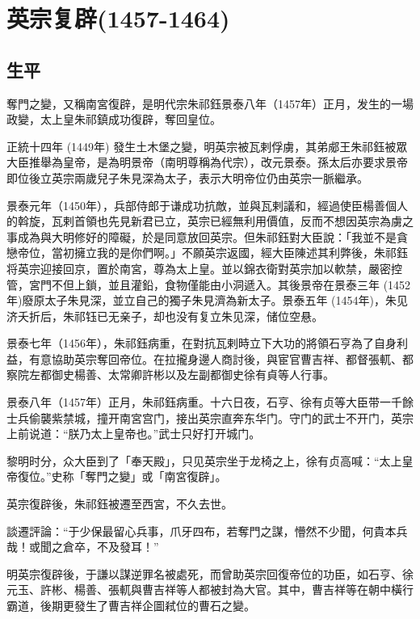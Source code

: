 
\section{英宗复辟\tiny(1457-1464)}

\subsection{生平}

奪門之變，又稱南宮復辟，是明代宗朱祁鈺景泰八年（1457年）正月，发生的一場政變，太上皇朱祁鎮成功復辟，奪回皇位。

正統十四年 (1449年) 發生土木堡之變，明英宗被瓦剌俘虜，其弟郕王朱祁鈺被眾大臣推舉為皇帝，是為明景帝（南明尊稱為代宗），改元景泰。孫太后亦要求景帝即位後立英宗兩歲兒子朱見深為太子，表示大明帝位仍由英宗一脈繼承。

景泰元年（1450年），兵部侍郎于谦成功抗敵，並與瓦剌議和，經過使臣楊善個人的斡旋，瓦剌首領也先見新君已立，英宗已經無利用價值，反而不想因英宗為虜之事成為與大明修好的障礙，於是同意放回英宗。但朱祁鈺對大臣說：「我並不是貪戀帝位，當初擁立我的是你們啊。」不願英宗返國，經大臣陳述其利弊後，朱祁鈺将英宗迎接回京，置於南宮，尊為太上皇。並以錦衣衛對英宗加以軟禁，嚴密控管，宮門不但上鎖，並且灌鉛，食物僅能由小洞遞入。其後景帝在景泰三年 (1452年)廢原太子朱見深，並立自己的獨子朱見濟為新太子。景泰五年 (1454年)，朱见济夭折后，朱祁钰已无亲子，却也没有复立朱见深，储位空悬。

景泰七年（1456年），朱祁鈺病重，在對抗瓦剌時立下大功的將領石亨為了自身利益，有意協助英宗奪回帝位。在拉攏身邊人商討後，與宦官曹吉祥、都督張軏、都察院左都御史楊善、太常卿許彬以及左副都御史徐有貞等人行事。

景泰八年（1457年）正月，朱祁鈺病重。十六日夜，石亨、徐有贞等大臣带一千餘士兵偷襲紫禁城，撞开南宮宫门，接出英宗直奔东华门。守门的武士不开门，英宗上前说道：“朕乃太上皇帝也。”武士只好打开城门。

黎明时分，众大臣到了「奉天殿」，只见英宗坐于龙椅之上，徐有贞高喊：“太上皇帝復位。”史称「奪門之變」或「南宮復辟」。

英宗復辟後，朱祁鈺被遷至西宮，不久去世。

談遷評論：“于少保最留心兵事，爪牙四布，若奪門之謀，懵然不少聞，何貴本兵哉！或聞之倉卒，不及發耳！”

明英宗復辟後，于謙以謀逆罪名被處死，而曾助英宗回復帝位的功臣，如石亨、徐元玉、許彬、楊善、張軏與曹吉祥等人都被封為大官。其中，曹吉祥等在朝中橫行霸道，後期更發生了曹吉祥企圖弒位的曹石之變。

